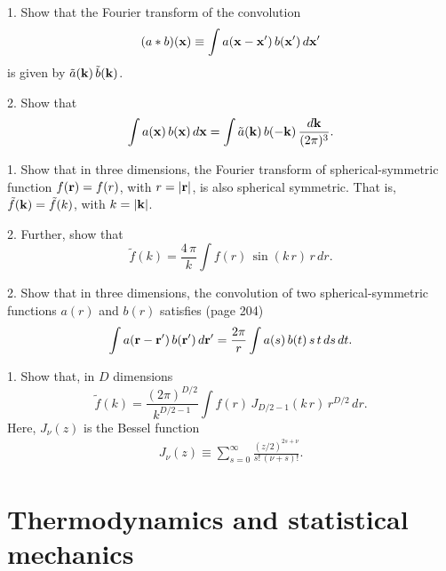 \documentclass[12pt]{book}
\begin{document}

1. Show that the Fourier transform of the convolution
\begin{equation}
  (a*b)(\boldsymbol{\mathbf{x}})
\equiv
  \int a(\boldsymbol{\mathbf{x}} - \boldsymbol{\mathbf{x}}') \, b(\boldsymbol{\mathbf{x}}') \, d\boldsymbol{\mathbf{x}}'
  \label{eq:convolution}
\end{equation}
is given by $\tilde{a}(\boldsymbol{\mathbf{k}}) \, \tilde{b}(\boldsymbol{\mathbf{k}})$.

2. Show that
\begin{equation}
  \int a(\boldsymbol{\mathbf{x}}) \, b(\boldsymbol{\mathbf{x}}) \, d\boldsymbol{\mathbf{x}}
=
  \int \tilde{a}(\boldsymbol{\mathbf{k}}) \, b(-\boldsymbol{\mathbf{k}}) \, \frac{ d \boldsymbol{\mathbf{k}} }{(2\pi)^3}.
\end{equation}







1. Show that in three dimensions,
the Fourier transform of spherical-symmetric function
$f(\boldsymbol{\mathbf{r}}) = f(r)$, with $r = |\boldsymbol{\mathbf{r}}|$,
is also spherical symmetric.
%
That is, $\tilde f(\boldsymbol{\mathbf{k}}) = \tilde f(k)$, with $k = |\boldsymbol{\mathbf{k}}|$.

2. Further, show that
\begin{equation}
  \tilde f(k)
=
\frac{ 4 \, \pi } {k}
  \int
  f(r) \,
  \sin(k\,r) \,
  r \,
  dr.
  \label{eq:FourierTransformSpherical3D}
\end{equation}

2. Show that in three dimensions,
the convolution of
two spherical-symmetric functions $a(r)$ and $b(r)$
satisfies\cite{hill} (page 204)
\[
  \int a(\boldsymbol{\mathbf{r}} - \boldsymbol{\mathbf{r}}') \, b(\boldsymbol{\mathbf{r}}') \, d\boldsymbol{\mathbf{r}}'
=
  \frac{2\pi}{r} \int a(s) \, b(t) \, s \, t \, ds \, dt.
\]






1. Show that, in $D$ dimensions
\begin{equation}
  \tilde f(k)
=
  \frac{(2 \pi)^{D/2}} {k^{D/2 - 1}}
  \int
  f(r) \,
  J_{D/2-1}(k\,r) \,
  r^{D/2} \,
  dr.
  \label{eq:FourierTransformSpherical}
\end{equation}
Here, $J_\nu(z)$ is the Bessel function
\begin{align}
  J_\nu(z)
\equiv
  \sum_{s = 0}^\infty
  \frac{ (z/2)^{2s + \nu } }
  { s! \, (\nu + s)! }.
  \label{eq:Bessel}
\end{align}



\chapter{Thermodynamics and statistical mechanics}
\end{document}
